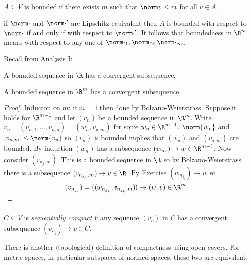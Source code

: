 \documentclass[a4paper]{article}
\theoremstyle{definition}
\begin{document}
\begin{definition}[Boundedness]
  \(A \subseteq V\) is bounded if there exists \(m\) such that \(\norm v \leq m \) for all \(v\in A\).
\end{definition}

\begin{remark}
  if \(\norm \cdot\) and \(\norm \cdot'\) are Lipschitz equivalent then \(A\) is bounded with respect to \(\norm \cdot\) if and only if with respect to \(\norm \cdot'\). It follows that boundedness in \(\R^n\) means with respect to any one of \(\norm \cdot_1, \norm \cdot_2, \norm \cdot_\infty\).
\end{remark}

Recall from Analysis I:
\begin{theorem}
  A bounded sequence in \(\R\) has a convergent subsequence.
\end{theorem}

\begin{corollary}
  A bounded sequence in \(\R^m\) has a convergent subsequence.
\end{corollary}

\begin{proof}
  Inducton on \(m\): if \(m=1\) then done by Bolzano-Weierstrass. Suppose it holds for \(\R^{m-1}\) and let \((v_n)\) be a bounded sequence in \(\R^m\). Write \(v_n = (v_{n,1},\dots,v_{n,n}) = (w_n,v_{n,m})\) for some \(w_n\in \R^{m-1}\). \(\norm{w_n}\) and \(|v_{n,m}| \leq \norm{v_n}\) so \((v_n)\) is bounded implies that \((w_n)\) and \((v_{n,m})\) are bounded. By induction \((w_n)\) has a subsequence \((w_{n_j}) \to w \in \R^{m-1}\). Now consider \((v_{n_j,m})\). This is a bounded sequence in \(\R\) so by Bolzano-Weierstrass there is a subsequence \((v_{n_{j_k},m}) \to v \in\R\). By Exercise \((w_{n_{j_k}}) \to w\) so
  \[
    (v_{n_{j_k}}) = ((w_{n_{j_k}},v_{n_{j_k},m})) \to (w, v) \in \R^m.
  \]
\end{proof}

\begin{definition}
  \(C \subseteq V\) is \emph{sequentially compact} if any sequence \((v_n)\) in \(C\) has a convergent subsequence \((v_{n_j}) \to v \in C\).
\end{definition}

\begin{remark}
  There is another (topological) definition of compactness using open covers. For metric spaces, in particular subspaces of normed spaces, these two are equivalent.
\end{remark}
\end{document}
